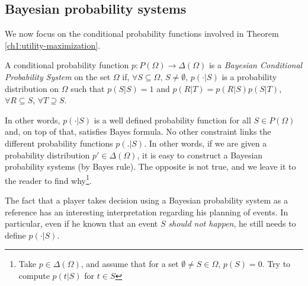\subsection{Bayesian probability systems}

We now focus on the conditional probability functions involved in Theorem \ref{ch1:utility-maximization}.
\begin{definition}
A conditional probability function $p: P(\Omega) \rightarrow \Delta(\Omega)$ is a \emph{Bayesian Conditional Probability System} on the set $\Omega$ if, $\forall S \subseteq \Omega, \, S \neq \emptyset$, $p(\cdot|S)$ is a probability distribution on $\Omega$ such that $p(S|S) = 1$ and $p(R|T) = p(R|S) p(S|T)$, $\forall R \subseteq S$, $\forall T \supseteq S.$
\end{definition}

In other words, $p(\cdot|S)$  is a well defined probability function for all $S \in P(\Omega)$ and, on top of that, satisfies Bayes formula. No other constraint links the different probability functions $p(.|S)$.
In other words,  if we are given a probability distribution $p' \in \Delta(\Omega)$, it is easy to construct a Bayesian probability systems (by Bayes rule). The opposite is not true, and we leave it to the reader to find why\footnote{Take $p \in \Delta(\Omega)$, and assume that for a set $\emptyset \neq S \in \Omega$, $p(S) = 0$. Try to compute $p(t|S)$ for $t \in S$}.

The fact that a player takes decision using a Bayesian probability system as a reference has an interesting interpretation regarding his planning of events. In particular, even if he known that  an event $S$ \emph{should not happen}, he still needs to define $p(\cdot|S)$.


